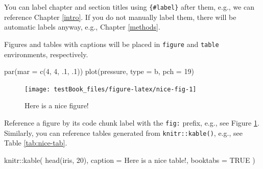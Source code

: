 \documentclass[
]{book}
\newenvironment{Shaded}{\begin{snugshade}}{\end{snugshade}}
\newcommand{\AttributeTok}[1]{\textcolor[rgb]{0.77,0.63,0.00}{#1}}
\newcommand{\ConstantTok}[1]{\textcolor[rgb]{0.00,0.00,0.00}{#1}}
\newcommand{\DecValTok}[1]{\textcolor[rgb]{0.00,0.00,0.81}{#1}}
\newcommand{\FunctionTok}[1]{\textcolor[rgb]{0.00,0.00,0.00}{#1}}
\newcommand{\NormalTok}[1]{#1}
\newcommand{\SpecialCharTok}[1]{\textcolor[rgb]{0.00,0.00,0.00}{#1}}
\newcommand{\StringTok}[1]{\textcolor[rgb]{0.31,0.60,0.02}{#1}}
\begin{document}
You can label chapter and section titles using \texttt{\{\#label\}} after them, e.g., we can reference Chapter \ref{intro}. If you do not manually label them, there will be automatic labels anyway, e.g., Chapter \ref{methods}.

Figures and tables with captions will be placed in \texttt{figure} and \texttt{table} environments, respectively.

\begin{Shaded}
\begin{Highlighting}[]
\FunctionTok{par}\NormalTok{(}\AttributeTok{mar =} \FunctionTok{c}\NormalTok{(}\DecValTok{4}\NormalTok{, }\DecValTok{4}\NormalTok{, .}\DecValTok{1}\NormalTok{, .}\DecValTok{1}\NormalTok{))}
\FunctionTok{plot}\NormalTok{(pressure, }\AttributeTok{type =} \StringTok{\textquotesingle{}b\textquotesingle{}}\NormalTok{, }\AttributeTok{pch =} \DecValTok{19}\NormalTok{)}
\end{Highlighting}
\end{Shaded}

\begin{figure}

{\centering \texttt{[image: testBook\_files/figure-latex/nice-fig-1]} 

}

\caption{Here is a nice figure!}\label{fig:nice-fig}
\end{figure}

Reference a figure by its code chunk label with the \texttt{fig:} prefix, e.g., see Figure \ref{fig:nice-fig}. Similarly, you can reference tables generated from \texttt{knitr::kable()}, e.g., see Table \ref{tab:nice-tab}.

\begin{Shaded}
\begin{Highlighting}[]
\NormalTok{knitr}\SpecialCharTok{::}\FunctionTok{kable}\NormalTok{(}
  \FunctionTok{head}\NormalTok{(iris, }\DecValTok{20}\NormalTok{), }\AttributeTok{caption =} \StringTok{\textquotesingle{}Here is a nice table!\textquotesingle{}}\NormalTok{,}
  \AttributeTok{booktabs =} \ConstantTok{TRUE}
\NormalTok{)}
\end{Highlighting}
\end{Shaded}
\end{document}
